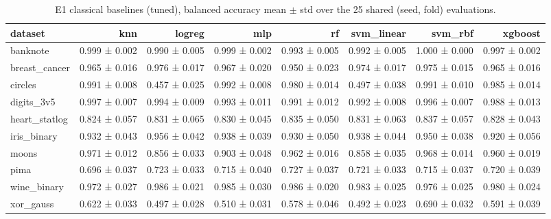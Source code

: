 \begin{table}[ht]
\centering
\caption{E1 classical baselines (tuned), balanced accuracy mean $\pm$ std over the 25 shared (seed, fold) evaluations.}
\label{tab:e1-tuned-balanced_accuracy}
\begin{tabular}{lrrrrrrr}
\toprule
dataset & knn & logreg & mlp & rf & svm\_linear & svm\_rbf & xgboost \\
\midrule
banknote & 0.999 ± 0.002 & 0.990 ± 0.005 & 0.999 ± 0.002 & 0.993 ± 0.005 & 0.992 ± 0.005 & 1.000 ± 0.000 & 0.997 ± 0.002 \\
breast\_cancer & 0.965 ± 0.016 & 0.976 ± 0.017 & 0.967 ± 0.020 & 0.950 ± 0.023 & 0.974 ± 0.017 & 0.975 ± 0.015 & 0.965 ± 0.016 \\
circles & 0.991 ± 0.008 & 0.457 ± 0.025 & 0.992 ± 0.008 & 0.980 ± 0.014 & 0.497 ± 0.038 & 0.991 ± 0.010 & 0.985 ± 0.014 \\
digits\_3v5 & 0.997 ± 0.007 & 0.994 ± 0.009 & 0.993 ± 0.011 & 0.991 ± 0.012 & 0.992 ± 0.008 & 0.996 ± 0.007 & 0.988 ± 0.013 \\
heart\_statlog & 0.824 ± 0.057 & 0.831 ± 0.065 & 0.830 ± 0.045 & 0.835 ± 0.050 & 0.831 ± 0.063 & 0.837 ± 0.057 & 0.828 ± 0.043 \\
iris\_binary & 0.932 ± 0.043 & 0.956 ± 0.042 & 0.938 ± 0.039 & 0.930 ± 0.050 & 0.938 ± 0.044 & 0.950 ± 0.038 & 0.920 ± 0.056 \\
moons & 0.971 ± 0.012 & 0.856 ± 0.033 & 0.903 ± 0.048 & 0.962 ± 0.016 & 0.858 ± 0.035 & 0.968 ± 0.014 & 0.960 ± 0.019 \\
pima & 0.696 ± 0.037 & 0.723 ± 0.033 & 0.715 ± 0.040 & 0.727 ± 0.037 & 0.721 ± 0.033 & 0.715 ± 0.037 & 0.720 ± 0.039 \\
wine\_binary & 0.972 ± 0.027 & 0.986 ± 0.021 & 0.985 ± 0.030 & 0.986 ± 0.020 & 0.983 ± 0.025 & 0.976 ± 0.025 & 0.980 ± 0.024 \\
xor\_gauss & 0.622 ± 0.033 & 0.497 ± 0.028 & 0.510 ± 0.031 & 0.578 ± 0.046 & 0.492 ± 0.023 & 0.690 ± 0.032 & 0.591 ± 0.039 \\
\bottomrule
\end{tabular}
\end{table}
